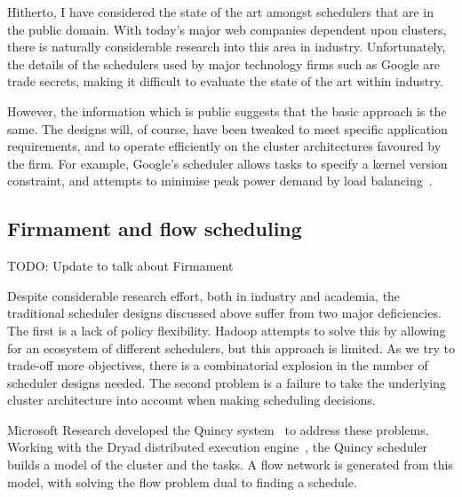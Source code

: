 Hitherto, I have considered the state of the art amongst schedulers that are in the public domain. With today's major web companies dependent upon clusters, there is naturally considerable research into this area in industry. Unfortunately, the details of the schedulers used by major technology firms such as Google are trade secrets, making it difficult to evaluate the state of the art within industry. 

However, the information which is public suggests that the basic approach is the same. The designs will, of course, have been tweaked to meet specific application requirements, and to operate efficiently on the cluster architectures favoured by the firm. For example, Google's scheduler allows tasks to specify a kernel version constraint, and attempts to minimise peak power demand by load balancing~\cite[\S2.1]{Sharma:2011}.

\subsection{Firmament and flow scheduling}

TODO: Update to talk about Firmament

Despite considerable research effort, both in industry and academia, the traditional scheduler designs discussed above suffer from two major deficiencies. The first is a lack of policy flexibility. Hadoop attempts to solve this by allowing for an ecosystem of different schedulers, but this approach is limited. As we try to trade-off more objectives, there is a combinatorial explosion in the number of scheduler designs needed. The second problem is a failure to take the underlying cluster architecture into account when making scheduling decisions.


Microsoft Research developed the Quincy system~\cite{Isard:2009} to address these problems. Working with the Dryad distributed execution engine~\cite{Isard:2007}\footnotemark, the Quincy scheduler builds a model of the cluster and the tasks. A flow network is generated from this model, with solving the flow problem dual to finding a schedule.

